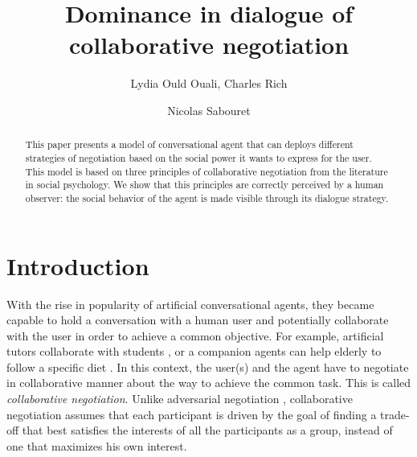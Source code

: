 \documentclass{llncs}
\begin{document}
	\title{\vskip -10pt Dominance in dialogue of collaborative negotiation}
	
	\author{Lydia Ould Ouali, Charles Rich \and
		Nicolas Sabouret }
	

	\maketitle
	
	\begin{abstract}
		This paper presents a model of conversational agent that can deploys different strategies of negotiation based on the social power it wants to express for the user. This model is based on three principles of collaborative negotiation from the literature in social psychology. We show that this principles are correctly perceived by a human observer: the social behavior of the agent is made visible through its dialogue strategy.
	\end{abstract}
	
	\section{Introduction}
	With the rise in popularity of artificial conversational agents, they became capable to hold a conversation with a human user and potentially collaborate with the user in order to achieve a common objective. For example, artificial tutors collaborate with students \cite{gulz2011extending}, or a companion agents can help elderly to follow a specific diet \cite{kidd2005sociable}. In this context, the user(s) and the agent have to negotiate in collaborative manner about the way to achieve the common task. This is called \emph{collaborative negotiation}. Unlike adversarial negotiation \cite{traum2008multi}, collaborative negotiation assumes that each participant is driven by the goal of finding a trade-off that best satisfies the interests of all the participants as a group, instead of one that maximizes his own interest\cite{sidnerartificial,chu1995response}.
	
\end{document}
